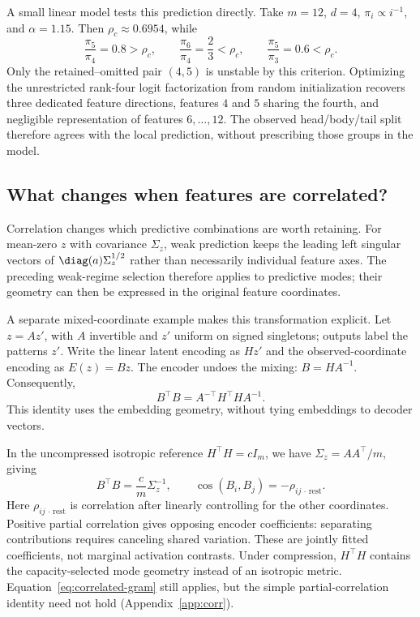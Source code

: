 A small linear model tests this prediction directly. Take
$m=12$, $d=4$, $\pi_i\propto i^{-1}$, and $\alpha=1.15$.
Then $\rho_c\approx0.6954$, while
\[
\frac{\pi_5}{\pi_4}=0.8>\rho_c,
\qquad
\frac{\pi_6}{\pi_4}=\frac23<\rho_c,
\qquad
\frac{\pi_5}{\pi_3}=0.6<\rho_c.
\]
Only the retained--omitted pair $(4,5)$ is unstable by this
criterion. Optimizing the unrestricted rank-four logit
factorization from random initialization recovers three
dedicated feature directions, features $4$ and $5$ sharing the
fourth, and negligible representation of features $6,\ldots,12$.
The observed head/body/tail split therefore agrees with the
local prediction, without prescribing those groups in the model.

\subsection{What changes when features are correlated?}

Correlation changes which predictive combinations are worth
retaining. For mean-zero $z$ with covariance $\Sigma_z$, weak
prediction keeps the leading left singular vectors of
$\diag(a)\Sigma_z^{1/2}$ rather than necessarily individual
feature axes. The preceding weak-regime selection therefore
applies to predictive modes; their geometry can then be
expressed in the original feature coordinates.

A separate mixed-coordinate example makes this transformation
explicit. Let $z=Az'$, with $A$ invertible and $z'$ uniform on
signed singletons; outputs label the patterns $z'$. Write the
linear latent encoding as $Hz'$ and the observed-coordinate
encoding as $E(z)=Bz$. The encoder undoes the mixing:
$B=HA^{-1}$. Consequently,
\begin{equation}
\boxed{
B^\top B=A^{-\top}H^\top H A^{-1}.
}
\label{eq:correlated-gram}
\end{equation}
This identity uses the embedding geometry, without tying
embeddings to decoder vectors.

In the uncompressed isotropic reference $H^\top H=cI_m$,
we have $\Sigma_z=AA^\top/m$, giving
\begin{equation}
\boxed{
B^\top B=\frac{c}{m}\Sigma_z^{-1},
\qquad
\cos(B_i,B_j)=-\rho_{ij\,\cdot\,\mathrm{rest}}.
}
\label{eq:partial}
\end{equation}
Here $\rho_{ij\,\cdot\,\mathrm{rest}}$ is correlation after
linearly controlling for the other coordinates. Positive
partial correlation gives opposing encoder coefficients:
separating contributions requires canceling shared variation.
These are jointly fitted coefficients, not marginal activation
contrasts. Under compression, $H^\top H$ contains the
capacity-selected mode geometry instead of an isotropic metric.
Equation~\eqref{eq:correlated-gram} still applies, but the simple
partial-correlation identity need not hold
(Appendix~\ref{app:corr}).

